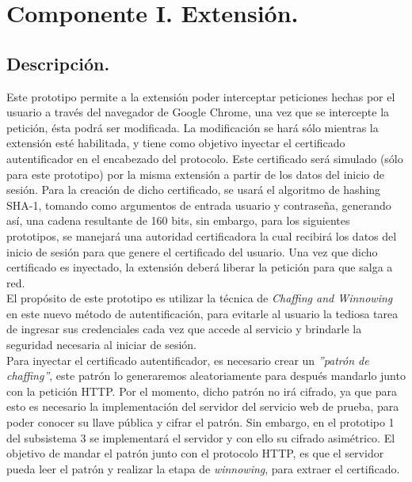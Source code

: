 \documentclass[12pt, a4paper, titlepage]{report}
\begin{document}
		\section{Componente I. Extensión.}
		    \subsection{Descripción.}
		    
		    Este prototipo permite a la extensión poder interceptar peticiones hechas por el usuario a través del navegador de Google Chrome, una vez que se intercepte la petición, ésta podrá ser modificada. La modificación se hará sólo mientras la extensión esté habilitada, y tiene como objetivo inyectar el certificado autentificador en el encabezado del protocolo. Este certificado será simulado (sólo para este prototipo) por la misma extensión a partir de los datos del inicio de sesión. Para la creación de dicho certificado, se usará el algoritmo de hashing SHA-1, tomando como argumentos de entrada usuario y contraseña, generando así, una cadena resultante de 160 bits, sin embargo, para los siguientes prototipos, se manejará una autoridad certificadora la cual recibirá los datos del inicio de sesión para que genere el certificado del usuario. Una vez que dicho certificado es inyectado, la extensión deberá liberar la petición para que salga a red.\\
		    
		    El propósito de este prototipo es utilizar la técnica de \textit{Chaffing and Winnowing} en este nuevo método de autentificación, para evitarle al usuario la tediosa tarea de ingresar sus credenciales cada vez que accede al servicio y brindarle la seguridad necesaria al iniciar de sesión.\\
		    
		    Para inyectar el certificado autentificador, es necesario crear un \textit{''patrón de chaffing''}, este patrón lo generaremos aleatoriamente para después mandarlo junto con la petición HTTP. Por el momento, dicho patrón no irá cifrado, ya que para esto es necesario la implementación del servidor del servicio web de prueba, para poder conocer su llave pública y cifrar el patrón. Sin embargo, en el prototipo 1 del subsistema 3 se implementará el servidor y con ello su cifrado asimétrico. El objetivo de mandar el patrón junto con el protocolo HTTP, es que el servidor pueda leer el patrón y realizar la etapa de \textit{winnowing}, para extraer el certificado.\\
            
\end{document}
